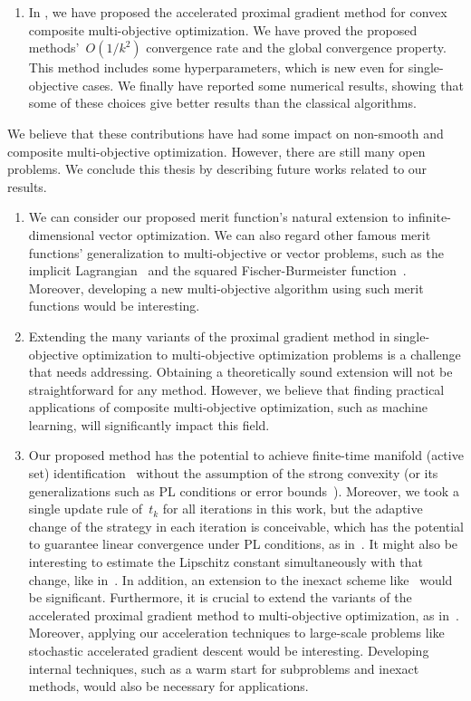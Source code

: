 \documentclass[../main]{subfiles}
\begin{document}
\begin{enumerate}
    \item In , we have proposed the accelerated proximal gradient method for convex composite multi-objective optimization.
        We have proved the proposed methods'~$O(1 / k^2)$ convergence rate and the global convergence property.
        This method includes some hyperparameters, which is new even for single-objective cases.
        We finally have reported some numerical results, showing that some of these choices give better results than the classical algorithms.
\end{enumerate}

We believe that these contributions have had some impact on non-smooth and composite multi-objective optimization.
However, there are still many open problems.
We conclude this thesis by describing future works related to our results.
\begin{enumerate}
    \item We can consider our proposed merit function's natural extension to infinite-dimensional vector optimization.
        We can also regard other famous merit functions' generalization to multi-objective or vector problems, such as the implicit Lagrangian~\cite{Mangasarian1993} and the squared Fischer-Burmeister function~\cite{Kanzow1996}.
        Moreover, developing a new multi-objective algorithm using such merit functions would be interesting.

    \item Extending the many variants of the proximal gradient method in single-objective optimization to multi-objective optimization problems is a challenge that needs addressing.
        Obtaining a theoretically sound extension will not be straightforward for any method.
        However, we believe that finding practical applications of composite multi-objective optimization, such as machine learning, will significantly impact this field.

    \item Our proposed method has the potential to achieve finite-time manifold (active set) identification~\cite{Sun2019} without the assumption of the strong convexity (or its generalizations such as PL conditions or error bounds~\cite{Karimi2016}).
        Moreover, we took a single update rule of~$t_k$ for all iterations in this work, but the adaptive change of the strategy in each iteration is conceivable, which has the potential to guarantee linear convergence under PL conditions, as in~\cite{Aujol2021}.
        It might also be interesting to estimate the Lipschitz constant simultaneously with that change, like in~\cite{Scheinberg2014}.
        In addition, an extension to the inexact scheme like~\cite{Villa2013} would be significant.
        Furthermore, it is crucial to extend the variants of the accelerated proximal gradient method to multi-objective optimization, as in~\cite{Nishimura2022,Chen2022}.
        Moreover, applying our acceleration techniques to large-scale problems like stochastic accelerated gradient descent would be interesting.
        Developing internal techniques, such as a warm start for subproblems and inexact methods, would also be necessary for applications.
\end{enumerate}
\end{document}
